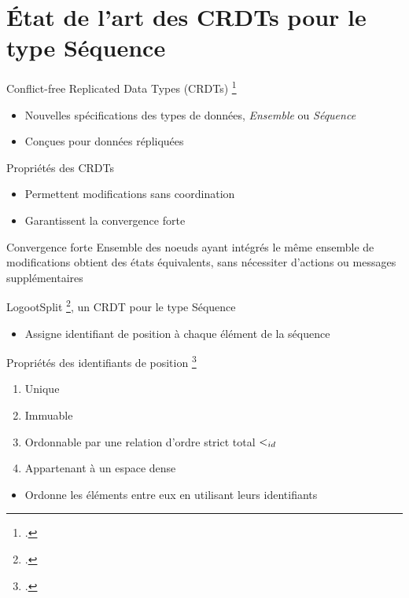 \section{État de l'art des CRDTs pour le type Séquence}

\begin{frame}{Conflict-free Replicated Data Types (CRDTs) \footcite{shapiro_2011_crdt}}
    \begin{itemize}
        \item Nouvelles spécifications des types de données, \eg \emph{Ensemble} ou \emph{Séquence}
        \item Conçues pour données répliquées
    \end{itemize}
    \pause
    \begin{block}{Propriétés des CRDTs}
        \begin{itemize}
            \item Permettent modifications \alert{sans coordination}
            \item Garantissent la \alert{convergence forte}
        \end{itemize}
    \end{block}
    \pause
    \begin{block}{Convergence forte}
        Ensemble des noeuds ayant intégrés le même ensemble de modifications obtient des états équivalents, sans nécessiter d'actions ou messages supplémentaires
    \end{block}
\end{frame}

\begin{frame}{LogootSplit \footcite{2013-logootsplit}, un CRDT pour le type Séquence}
    \begin{itemize}
        \item Assigne \alert{identifiant de position} à chaque élément de la séquence
    \end{itemize}
    \pause
    \begin{block}{Propriétés des identifiants de position \footcite{2009-treedoc-preguica}}
        \begin{enumerate}
            \item Unique
            \item Immuable
            \item Ordonnable par une relation d'ordre strict total $<_{id}$
            \item Appartenant à un espace dense
        \end{enumerate}
    \end{block}
    \pause
    \begin{itemize}
        \item \alert{Ordonne les éléments} entre eux \alert{en utilisant} leurs \alert{identifiants}
    \end{itemize}
\end{frame}

